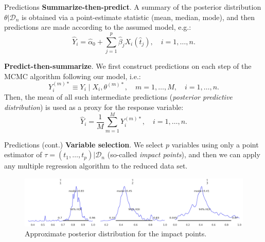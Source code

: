 \documentclass[10pt, english, professionalfonts]{beamer}
\begin{document}
\begin{frame}{Predictions}
  \textbf{Summarize-then-predict}. A summary of the posterior distribution \(\theta| \mathcal D_n\) is obtained via a point-estimate statistic (mean, median, mode), and then predictions are made according to the assumed model, e.g.:
  \[
  \hat Y_i =\hat \alpha_0 + \sum_{j=1}^p \hat \beta_j X_i(\hat t_j), \quad i=1,\dots, n.
  \]

  \textbf{Predict-then-summarize}. We first construct predictions on each step of the MCMC algorithm following our model, i.e.:
  \[
    Y_i^{(m)*} \equiv Y_i \mid X_i, \theta^{(m)*}, \quad m=1,\dots,M, \quad i=1,\dots, n.
  \]
  Then, the mean of all such intermediate predictions (\textit{posterior predictive distribution}) is used as a proxy for the response variable:
  \[
    \hat Y_i = \frac{1}{M}\sum_{m=1}^M Y_i^{(m)*}, \quad i=1,\dots, n.
  \]

\end{frame}

\begin{frame}{Predictions (cont.)}
    \textbf{Variable selection}. We select \(p\) variables using only a point estimator of \(\tau=(t_1,\dots, t_p)|\mathcal D_n\) (so-called \textit{impact points}), and then we can apply any multiple regression algorithm to the reduced data set.
    \vspace{1em}

    \begin{figure}
      \includegraphics[width=\textwidth]{img/tau_posterior}
      \caption{Approximate posterior distribution for the impact points.}
    \end{figure}
\end{frame}

%
\end{document}
